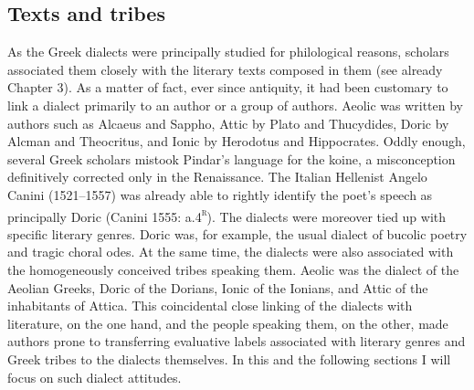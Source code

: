 \subsection{Texts and tribes}
\hypertarget{Toc19704850}{}\begin{styleStandard}
As the Greek dialects were principally studied for philological reasons, scholars associated them closely with the literary texts composed in them (see already Chapter 3). As a matter of fact, ever since antiquity, it had been customary to link a dialect primarily to an author or a group of authors. Aeolic was written by authors such as Alcaeus and Sappho, Attic by Plato and Thucydides, Doric by Alcman and Theocritus, and Ionic by Herodotus and Hippocrates. Oddly enough, several Greek scholars mistook Pindar’s language for the koine, a misconception definitively corrected only in the Renaissance. The Italian Hellenist Angelo Canini (1521–1557) was already able to rightly identify the poet’s speech as principally Doric (Canini 1555: a.4\textsc{\textsuperscript{r}}). The dialects were moreover tied up with specific literary genres. Doric was, for example, the usual dialect of bucolic poetry and tragic choral odes. At the same time, the dialects were also associated with the homogeneously conceived tribes speaking them. Aeolic was the dialect of the Aeolian Greeks, Doric of the Dorians, Ionic of the Ionians, and Attic of the inhabitants of Attica. This coincidental close linking of the dialects with literature, on the one hand, and the people speaking them, on the other, made authors prone to transferring evaluative labels associated with literary genres and Greek tribes to the dialects themselves. In this and the following sections I will focus on such dialect attitudes.
\end{styleStandard}

